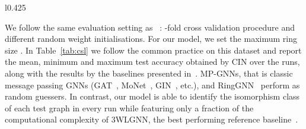 \documentclass{article}
\begin{document}
\begin{wraptable}[7]{l}{0.425\textwidth}
        \centering
        \vspace{-13pt}
        \begin{minipage}[t]{1.0\linewidth}
\caption{Classification accuracy on CSL.}\label{tab:csl}
    \end{minipage}
\end{wraptable}

We follow the same evaluation setting as ~\citet{dwivedi2020benchmarkgnns}: -fold cross validation procedure and  different random weight initialisations. For our model, we set the maximum ring size . In Table~\ref{tab:csl} we follow the common practice on this dataset and report the mean, minimum and maximum test accuracy obtained by CIN over the  runs, along with the results by the baselines presented in~\citet{dwivedi2020benchmarkgnns}.
MP-GNNs, 
that is classic message passing GNNs (GAT~\citep{velivckovic2017graph}, MoNet~\citep{Monti_etal2017}, GIN~\citep{GIN}, etc.), and RingGNN~\citep{Chen2019_ring_gnn} perform as random guessers. In contrast, our model is able to identify the isomorphism class of each test graph in every run while featuring only a fraction of the computational complexity of 3WLGNN, the best performing reference baseline~\citep{dwivedi2020benchmarkgnns, maron2019provably}.
\end{document}
